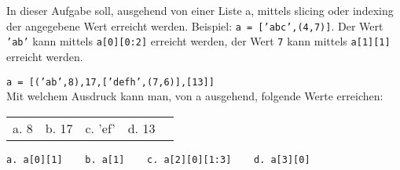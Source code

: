 \question[4]
In dieser Aufgabe soll, ausgehend von einer Liste a, mittels slicing oder
 indexing der angegebene Wert erreicht werden.
Beispiel: \texttt{a = ['abc',(4,7)]}.
Der Wert \texttt{'ab'} kann mittels \texttt{a[0][0:2]} erreicht werden, der Wert
\texttt{7} kann mittels \texttt{a[1][1]} erreicht werden.

\texttt{a = [('ab',8),17,['defh',(7,6)],[13]]} \\
Mit welchem Ausdruck kann man, von a ausgehend, folgende Werte erreichen:   \\
\begin{tabular}{lllll}
a. 8 & b. 17 & c. 'ef'  & d. 13 \\
\end{tabular}
\begin{solutionbox}{1cm}
\texttt{a. a[0][1]  ~~ b. a[1] ~~ c. a[2][0][1:3] ~~ d. a[3][0]}
\end{solutionbox}
